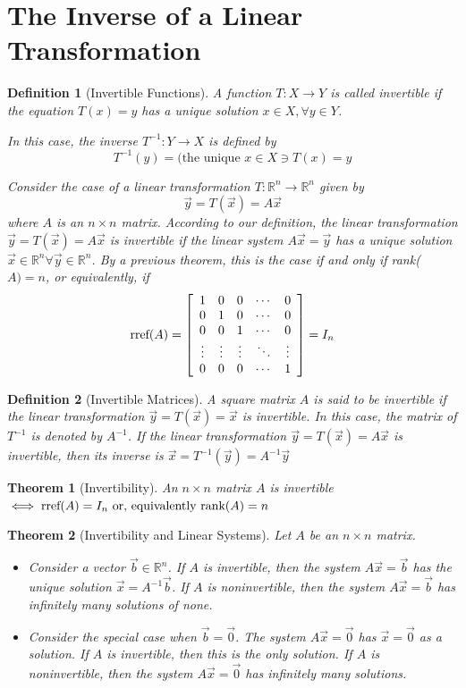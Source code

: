 \documentclass[10pt]{report}
\newtheorem{thm2}{Theorem}[section]
\newtheorem{def2}{Definition}[section]
\newcommand{\rref}{\textup{rref}}
\begin{document}
\section{The Inverse of a Linear Transformation}
\begin{def2}[Invertible Functions]
A function $T:X\to Y$ is called invertible if the equation $T(x)=y$ has a unique solution $x\in X, \forall y\in Y$.

In this case, the inverse $T^{-1}:Y\to X$ is defined by
$$T^{-1}(y) = \text{(the unique }x\in X \ni T(x) = y$$

Consider the case of a linear transformation $T:\mathbb{R}^n\to \mathbb{R}^n$ given by
$$\vec{y} = T(\vec{x}) = A\vec{x}$$
where $A$ is an $n\times n$ matrix. According to our definition, the linear transformation $\vec{y} = T(\vec{x}) = A\vec{x}$ is invertible if the linear system $A\vec{x} = \vec{y}$ has a unique solution $\vec{x}\in \mathbb{R}^n \forall \vec{y}\in \mathbb{R}^n$. By a previous theorem, this is the case if and only if rank($A)=n$, or equivalently, if
$$\rref(A) = \left[ \begin{array}{c c c c c}
1 & 0 & 0 & \cdots & 0\\
0 & 1 & 0 & \cdots & 0\\
0 & 0 & 1 & \cdots & 0\\
\vdots & \vdots & \vdots & \ddots & \vdots\\
0 & 0 & 0 & \cdots & 1\\
\end{array}\right] = I_n$$
\end{def2}
\begin{def2}[Invertible Matrices]
A square matrix $A$ is said to be invertible if the linear transformation $\vec{y} = T(\vec{x}) = \vec{x}$ is invertible. In this case, the matrix of $T^{-1}$ is denoted by $A^{-1}$. If the linear transformation $\vec{y} = T(\vec{x}) = A\vec{x}$ is invertible, then its inverse is $\vec{x} = T^{-1}(\vec{y}) = A^{-1}\vec{y}$
\end{def2}
\begin{thm2}[Invertibility]
An $n\times n$ matrix $A$ is invertible $\iff \rref(A)=I_n\text{ or, equivalently rank}(A) = n$ 
\end{thm2}
\begin{thm2}[Invertibility and Linear Systems]
Let $A$ be an $n\times n$ matrix.
\begin{itemize}
\item[a.] Consider a vector $\vec{b}\in \mathbb{R}^n$. If $A$ is invertible, then the system $A\vec{x}=\vec{b}$ has the unique solution $\vec{x}=A^{-1}\vec{b}$. If $A$ is noninvertible, then the system $A\vec{x}=\vec{b}$ has infinitely many solutions of none.
\item[b.] Consider the special case when $\vec{b}=\vec{0}$. The system $A\vec{x}=\vec{0}$ has $\vec{x}=\vec{0}$ as a solution. If $A$ is invertible, then this is the only solution. If $A$ is noninvertible, then the system $A\vec{x}=\vec{0}$ has infinitely many solutions.
\end{itemize}
\end{thm2}
\end{document}
